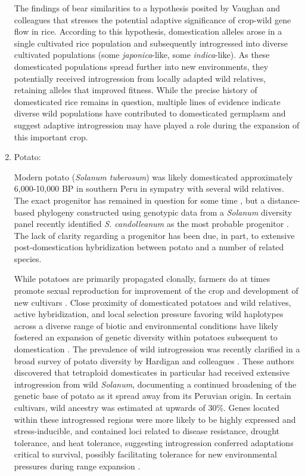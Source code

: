 \documentclass[11pt]{article}
\begin{document}
\begin{enumerate}
The findings of \citet{choi2018multiple} bear similarities to a hypothesis posited by Vaughan and colleagues \citeyearpar{vaughan2008evolving} that stresses the potential adaptive significance of crop-wild gene flow in rice.
According to this hypothesis, domestication alleles arose in a single cultivated rice population and subsequently introgressed into diverse cultivated populations (some \emph{japonica}-like, some \emph{indica}-like).
As these domesticated populations spread further into new environments, they potentially received introgression from locally adapted wild relatives, retaining alleles that improved fitness.
While the precise history of domesticated rice remains in question, multiple lines of evidence indicate diverse wild populations have contributed to domesticated germplasm and suggest adaptive introgression may have played a role during the expansion of this important crop.

\item{Potato:}

Modern potato (\emph{Solanum tuberosum}) was likely domesticated approximately 6,000-10,000 BP in southern Peru in sympatry with several wild relatives.
The exact progenitor has remained in question for some time \citep{spooner2005single, pickersgill1977origins, hawkes1988evolution}, but a distance-based phylogeny constructed using genotypic data from a \emph{Solanum} diversity panel recently identified \emph{S. candolleanum} as the most probable progenitor \citep{hardigan2015taxonomy}.
The lack of clarity regarding a progenitor has been due, in part, to extensive post-domestication hybridization between potato and a number of related species.

While potatoes are primarily propagated clonally, farmers do at times promote sexual reproduction for improvement of the crop and development of new cultivars \citep{quiros1992increase}.
Close proximity of domesticated potatoes and wild relatives, active hybridization, and local selection pressure favoring wild haplotypes across a diverse range of biotic and environmental conditions have likely fostered an expansion of genetic diversity within potatoes subsequent to domestication \citep{brush1995potato}.
The prevalence of wild introgression was recently clarified in a broad survey of potato diversity by Hardigan and colleagues \citeyearpar{hardigan2017genome}.
These authors discovered that tetraploid domesticates in particular had received extensive introgression from wild \emph{Solanum}, documenting a continued broadening of the genetic base of potato as it spread away from its Peruvian origin.
In certain cultivars, wild ancestry was estimated at upwards of 30\%.
Genes located within these introgressed regions were more likely to be highly expressed and stress-inducible, and contained loci related to disease resistance, drought tolerance, and heat tolerance, suggesting introgression conferred adaptations critical to survival, possibly facilitating tolerance for new environmental pressures during range expansion \citep{hardigan2017genome}.
\end{enumerate}
\end{document}
